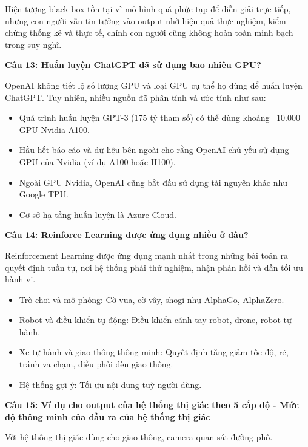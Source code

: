 Hiện tượng black box tồn tại vì mô hình quá phức tạp để diễn giải trực tiếp, nhưng con người vẫn tin tưởng vào output nhờ hiệu quả thực nghiệm, kiểm chứng thống kê và thực tế, chính con người cũng không hoàn toàn minh bạch trong suy nghĩ.

\textbf{Câu 13: Huấn luyện ChatGPT đã sử dụng bao nhiêu GPU?}

OpenAI không tiết lộ số lượng GPU và loại GPU cụ thể họ dùng để huấn luyện ChatGPT. Tuy nhiên, nhiều nguồn đã phân tính và ước tính như sau:

\begin{itemize}
	\item Quá trình huấn luyện GPT-3 (175 tỷ tham số) có thể dùng khoảng ~10.000 GPU Nvidia A100.
	
	\item Hầu hết báo cáo và dữ liệu bên ngoài cho rằng OpenAI chủ yếu sử dụng GPU của Nvidia (ví dụ A100 hoặc H100).
	
	\item Ngoài GPU Nvidia, OpenAI cũng bắt đầu sử dụng tài nguyên khác như Google TPU.
	
	\item Cơ sở hạ tầng huấn luyện là Azure Cloud.
\end{itemize}

\textbf{Câu 14: Reinforce Learning được ứng dụng nhiều ở đâu?}

Reinforcement Learning được ứng dụng mạnh nhất trong những bài toán ra quyết định tuần tự, nơi hệ thống phải thử nghiệm, nhận phản hồi và dần tối ưu hành vi.

\begin{itemize}
	\item Trò chơi và mô phỏng: Cờ vua, cờ vây, shogi như AlphaGo, AlphaZero.
	
	\item Robot và điều khiển tự động: Điều khiển cánh tay robot, drone, robot tự hành.
	
	\item Xe tự hành và giao thông thông minh: Quyết định tăng giảm tốc độ, rẽ, tránh va chạm, điều phối đèn giao thông.
	
	\item Hệ thống gợi ý: Tối ưu nội dung tuỳ người dùng.
\end{itemize}

\textbf{Câu 15: Ví dụ cho output của hệ thống thị giác theo 5 cấp độ - Mức độ thông minh của đầu ra của hệ thống thị giác}

Với hệ thống thị giác dùng cho giao thông, camera quan sát đường phố.

